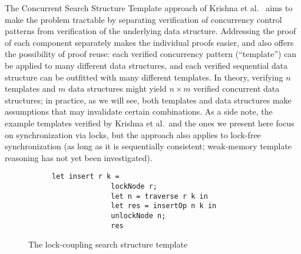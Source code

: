 \documentclass[sigplan,10pt,anonymous,review]{acmart}\settopmatter{printfolios=true,printccs=false,printacmref=false}
\begin{document}
The Concurrent Search Structure Template approach of Krishna et al.~\cite{templates} aims to make the problem tractable by separating verification of concurrency control patterns from verification of the underlying data structure. Addressing the proof of each component separately makes the individual proofs easier, and also offers the possibility of proof reuse: each verified concurrency pattern (``template'') can be applied to many different data structures, and each verified sequential data structure can be outfitted with many different templates. In theory, verifying $n$ templates and $m$ data structures might yield $n \times m$ verified concurrent data structures; in practice, as we will see, both templates and data structures make assumptions that may invalidate certain combinations. %
As a side note, the example templates verified by Krishna et al.~and the ones we present here focus on synchronization via locks, but the approach also applies to lock-free synchronization (as long as it is sequentially consistent; weak-memory template reasoning has not yet been investigated).

\begin{figure}[h]
	\begin{subfigure}[t]{0.45\textwidth}
		 
	\end{subfigure}\qquad
	\begin{subfigure}[t]{0.48\textwidth}
		\begin{lstlisting}[language=caml, style=myStyle]
			let insert r k =
			  lockNode r;
			  let n = traverse r k in
			  let res = insertOp n k in
			  unlockNode n; 
			  res\end{lstlisting}
	\end{subfigure}
	\caption{The lock-coupling search structure template}
	\label{template-ex}
\end{figure}


\begin{figure*}

\end{figure*}
\end{document}
